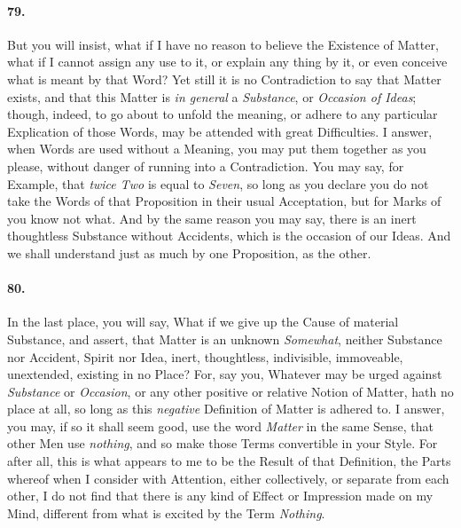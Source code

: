 \documentclass[]{article}
\newenvironment{sectionbody}{\begin{multicols}{2}}{\end{multicols}}
\begin{document}
\begin{sectionbody}
\paragraph{79.} But you will insist, what if I have no reason to believe the
Existence of Matter, what if I cannot assign any use to it, or
explain any thing by it, or even conceive what is meant by that
Word?  Yet still it is no Contradiction to say that Matter
exists, and that this Matter is \emph{in general} a
\emph{Substance}, or \emph{Occasion of Ideas}; though,
indeed, to go about to unfold the meaning, or adhere to any
particular Explication of those Words, may be attended with great
Difficulties.  I answer, when Words are used without a Meaning,
you may put them together as you please, without danger of
running into a Contradiction.  You may say, for Example, that
\emph{twice Two} is equal to \emph{Seven}, so long as you
declare you do not take the Words of that Proposition in their
usual Acceptation, but for Marks of you know not what.  And by
the same reason you may say, there is an inert thoughtless
Substance without Accidents, which is the occasion of our Ideas.
And we shall understand just as much by one Proposition, as the
other.



\paragraph{80.} In the last place, you will say, What if we give up the Cause of
material Substance, and assert, that Matter is an unknown
\emph{Somewhat}, neither Substance nor Accident, Spirit nor
Idea, inert, thoughtless, indivisible, immoveable, unextended,
existing in no Place?  For, say you, Whatever may be urged
against \emph{Substance} or \emph{Occasion}, or any other
positive or relative Notion of Matter, hath no place at all, so
long as this \emph{negative} Definition of Matter is adhered
to.  I answer, you may, if so it shall seem good, use the word
\emph{Matter} in the same Sense, that other Men use
\emph{nothing}, and so make those Terms convertible in your
Style.  For after all, this is what appears to me to be the
Result of that Definition, the Parts whereof when I consider with
Attention, either collectively, or separate from each other, I do
not find that there is any kind of Effect or Impression made on
my Mind, different from what is excited by the Term
\emph{Nothing}.




\end{sectionbody}
\end{document}
